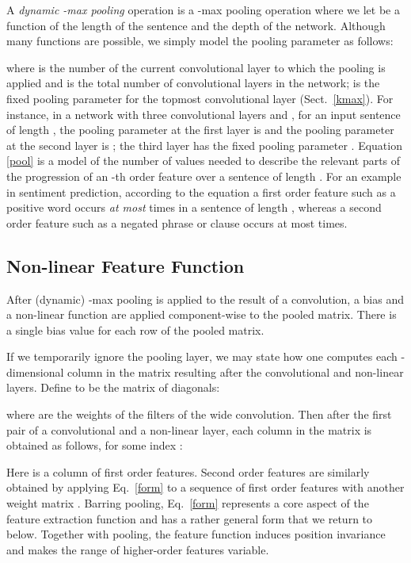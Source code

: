 \documentclass[11pt]{article}
\begin{document}
A \emph{dynamic -max pooling} operation is a -max pooling operation where we let  be a function of the length of the sentence and the depth of the network. Although many functions are possible, we simply model the pooling parameter as follows:

\vspace{-3pt}


\vspace{-3pt}
\noindent
where  is the number of the current convolutional layer to which the pooling is applied and  is the total number of convolutional layers in the network;  is the fixed pooling parameter for the topmost convolutional layer (Sect.~\ref{kmax}). For instance, in a network with three convolutional layers and , for an input sentence of length , the pooling parameter at the first layer is  and the pooling parameter at the second layer is ; the third layer has the fixed pooling parameter . Equation \ref{pool} is a model of the number of values needed to describe the relevant parts of the progression of an -th order feature over a sentence of length . For an example in sentiment prediction, according to the equation a first order feature such as a positive word occurs \emph{at most}  times in a sentence of length , whereas a second order feature such as a negated phrase or clause occurs at most  times.

\subsection{Non-linear Feature Function}

After (dynamic) -max pooling is applied to the result of a convolution, a bias  and a non-linear function  are applied component-wise to the pooled matrix. There is a single bias value for each row of the pooled matrix. 

If we temporarily ignore the pooling layer, we may state how one computes each -dimensional column  in the matrix  resulting after the convolutional and non-linear layers. Define  to be the matrix of diagonals:
\vspace{-3pt}


\vspace{-3pt}
\noindent where  are the weights of the  filters of the wide convolution.
Then after the first pair of a convolutional and a non-linear layer, each column  in the matrix  is obtained as follows, for some index :
\vspace{-3pt}


\vspace{-3pt}
\noindent Here  is a column of first order features. Second order features are similarly obtained by applying Eq.~\ref{form} to a sequence of first order features  with another weight matrix . Barring pooling, Eq.~\ref{form} represents a core aspect of the feature extraction function and has a rather general form that we return to below. Together with pooling, the feature function induces position invariance and makes the range of higher-order features variable. 
\end{document}

